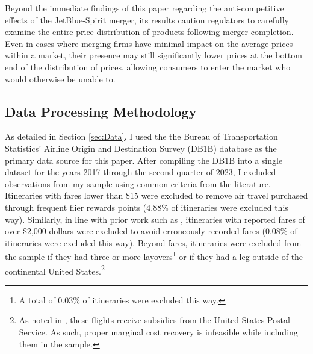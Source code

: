 \documentclass{article}
\begin{document}
    Beyond the immediate findings of this paper regarding the anti-competitive effects of the JetBlue-Spirit merger, its results caution regulators to carefully examine the entire price distribution of products following merger completion. Even in cases where merging firms have minimal impact on the average prices within a market, their presence may still significantly lower prices at the bottom end of the distribution of prices, allowing consumers to enter the market who would otherwise be unable to. 
    
	
	\pagebreak 
	 
	
	\FloatBarrier
	
\pagebreak 
\begin{appendices}
\setcounter{table}{0}
\setcounter{figure}{0}
\renewcommand{\thetable}{\Alph{section}\arabic{table}}
\renewcommand{\thefigure}{\Alph{section}\arabic{figure}}

	\section{Data Processing Methodology}
	\label{sec:DataProcessing}
	As detailed in Section \ref{sec:Data},	I used the the Bureau of Transportation Statistics' Airline Origin and Destination Survey (DB1B) database as the primary data source for this paper. After compiling the DB1B into a single dataset for the years 2017 through the second quarter of 2023, I excluded observations from my sample using common criteria from the literature. Itineraries with fares lower than \$15 were excluded to remove air travel purchased through frequent flier rewards points (4.88\% of itineraries were excluded this way). Similarly, in line with prior work such as \citet{berry_tracing_2010}, itineraries with reported fares of over \$2,000 dollars were excluded to avoid erroneously recorded fares (0.08\% of itineraries were excluded this way). Beyond fares, itineraries were excluded from the sample if they had three or more layovers\footnote{A total of 0.03\% of itineraries were excluded this way.} or if they had a leg outside of the continental United States.\footnote{As noted in \citet{ciliberto_market_2021}, these flights receive subsidies from the United States Postal Service. As such, proper marginal cost recovery is infeasible while including them in the sample.} 
	

\end{appendices}
\end{document}
